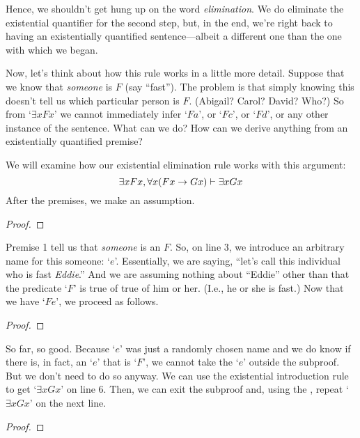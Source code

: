 \noindent Hence, we shouldn't get hung up on the word \textit{elimination}. We do eliminate the existential quantifier for the second step, but, in the end, we're right back to having an existentially quantified sentence---albeit a different one than the one with which we began.

Now, let's think about how this rule works in a little more detail. Suppose that we know that \emph{someone} is $F$ (say ``fast''). The problem is that simply knowing this doesn't tell us which particular person is $F$. (Abigail? Carol? David? Who?) So from `$\exists x Fx$' we cannot immediately infer `$Fa$', or `$Fc$', or `$Fd$',  or any other instance of the sentence. What can we do?  How can we derive anything from an existentially quantified premise?

We will examine how our existential elimination rule works with this argument:
$$\exists x Fx, \forall x(Fx \rightarrow Gx) \vdash \exists x Gx$$
After the premises, we make an assumption.
\begin{proof}
	 \pr{}
	 \pr{}
	\open
		 \as{}
\end{proof}
Premise 1 tell us that \emph{someone} is an $F$.  So, on line 3, we introduce an arbitrary name for this someone: `$e$'. Essentially, we are saying, ``let's call this individual who is fast \textit{Eddie}.'' And we are assuming nothing about ``Eddie'' other than that the predicate `$F$' is true of true of him or her. (I.e., he or she is fast.) Now that we have `$Fe$', we proceed as follows. 
\begin{proof}
	 \pr{}
	 \pr{}
	\open
		 \as{}
		 
\end{proof}
So far, so good. Because `$e$' was just a randomly chosen name and we do know if there is, in fact, an `$e$' that is `$F$', we cannot take the `$e$' outside the subproof. But we don't need to do so anyway. We can use the existential introduction rule to get `$\exists xGx$' on line 6. Then, we can exit the subproof and, using the , repeat `$\exists xGx$' on the next line.
\begin{proof}
	 \pr{}
	 \pr{}
	\open
		 \as{}
		 
	\close
\end{proof}


